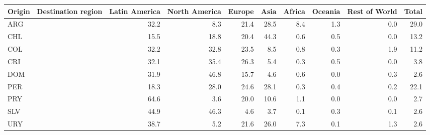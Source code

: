 \begin{tabular}{lrrrrrrrr}
\toprule
Origin \ Destination region & Latin America & North America & Europe & Asia & Africa & Oceania & Rest of World & Total \\
\midrule
ARG & 32.2 & 8.3 & 21.4 & 28.5 & 8.4 & 1.3 & 0.0 & 29.0 \\
CHL & 15.5 & 18.8 & 20.4 & 44.3 & 0.6 & 0.5 & 0.0 & 13.2 \\
COL & 32.2 & 32.8 & 23.5 & 8.5 & 0.8 & 0.3 & 1.9 & 11.2 \\
CRI & 32.1 & 35.4 & 26.3 & 5.4 & 0.3 & 0.5 & 0.0 & 3.8 \\
DOM & 31.9 & 46.8 & 15.7 & 4.6 & 0.6 & 0.0 & 0.3 & 2.6 \\
PER & 18.3 & 28.0 & 24.6 & 28.1 & 0.3 & 0.4 & 0.2 & 22.1 \\
PRY & 64.6 & 3.6 & 20.0 & 10.6 & 1.1 & 0.0 & 0.0 & 2.7 \\
SLV & 44.9 & 46.3 & 4.6 & 3.7 & 0.1 & 0.3 & 0.1 & 2.6 \\
URY & 38.7 & 5.2 & 21.6 & 26.0 & 7.3 & 0.1 & 1.3 & 2.6 \\
\bottomrule
\end{tabular}
